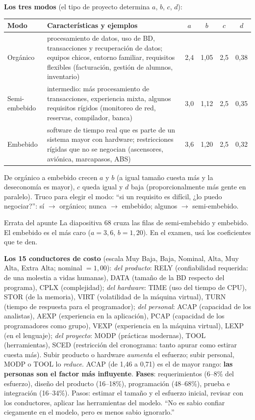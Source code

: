 \documentclass[11pt,a4paper]{article}
\begin{document}
\textbf{Los tres modos} (el tipo de proyecto determina $a$, $b$, $c$, $d$):
\begin{center}\small
\begin{tabularx}{\textwidth}{@{}l X c c c c@{}}
\toprule
\textbf{Modo} & \textbf{Características y ejemplos} & $a$ & $b$ & $c$ & $d$\\
\midrule
Orgánico & procesamiento de datos, uso de BD, transacciones y recuperación de datos; equipos chicos, entorno
familiar, requisitos flexibles (facturación, gestión de alumnos, inventario) & 2,4 & 1,05 & 2,5 & 0,38\\
Semi-embebido & intermedio: más procesamiento de transacciones, experiencia mixta, algunos requisitos rígidos
(monitoreo de red, reservas, compilador, banca) & 3,0 & 1,12 & 2,5 & 0,35\\
Embebido & software de tiempo real que es parte de un sistema mayor con hardware; restricciones rígidas que no
se negocian (ascensores, aviónica, marcapasos, ABS) & 3,6 & 1,20 & 2,5 & 0,32\\
\bottomrule
\end{tabularx}
\end{center}
De orgánico a embebido crecen $a$ y $b$ (a igual tamaño cuesta más y la deseconomía es mayor), $c$ queda igual
y $d$ baja (proporcionalmente más gente en paralelo). Truco para elegir el modo: ``si un requisito es difícil,
¿lo puedo negociar?'': sí $\to$ orgánico; nunca $\to$ embebido; algunos $\to$ semi-embebido.
\begin{aviso}{Errata del apunte}
La diapositiva 68 cruza las filas de semi-embebido y embebido. El embebido es el más caro ($a = 3{,}6$, $b =
1{,}20$). En el examen, usá los coeficientes que te den.
\end{aviso}

\textbf{Los 15 conductores de costo} (escala Muy Baja, Baja, Nominal, Alta, Muy Alta, Extra Alta; nominal $=
1{,}00$): \emph{del producto}: RELY (confiabilidad requerida: de una molestia a vidas humanas), DATA (tamaño de la
BD respecto del programa), CPLX (complejidad); \emph{del hardware}: TIME (uso del tiempo de CPU), STOR (de la
memoria), VIRT (volatilidad de la máquina virtual), TURN (tiempo de respuesta para el programador); \emph{del
personal}: ACAP (capacidad de los analistas), AEXP (experiencia en la aplicación), PCAP (capacidad de los
programadores como grupo), VEXP (experiencia en la máquina virtual), LEXP (en el lenguaje); \emph{del
proyecto}: MODP (prácticas modernas), TOOL (herramientas), SCED (restricción del cronograma: tanto apurar como
estirar cuesta más). Subir producto o hardware \emph{aumenta} el esfuerzo; subir personal, MODP o TOOL lo
\emph{reduce}. ACAP (de 1,46 a 0,71) es el de mayor rango: \textbf{las personas son el factor más influyente}.
\textbf{Fases}: requerimientos (6--8\% del esfuerzo), diseño del producto (16--18\%), programación (48--68\%),
prueba e integración (16--34\%). Pasos: estimar el tamaño y el esfuerzo inicial, revisar con los conductores,
aplicar las herramientas del modelo. ``No es sabio confiar ciegamente en el modelo, pero es menos sabio
ignorarlo.''
\end{document}
